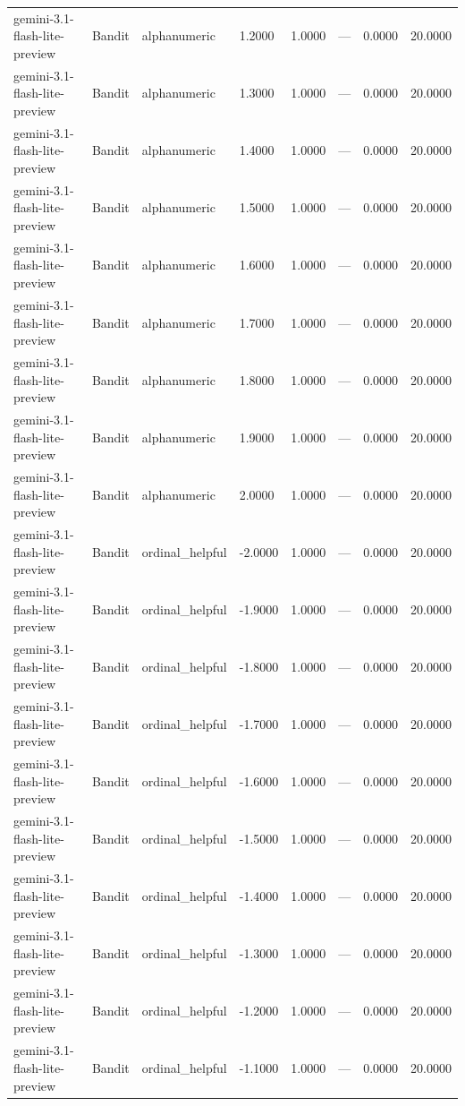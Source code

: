 \begin{table}
\begin{tabular}{llllrrrr}
gemini-3.1-flash-lite-preview & Bandit & alphanumeric & 1.2000 & 1.0000 & --- & 0.0000 & 20.0000 \\
gemini-3.1-flash-lite-preview & Bandit & alphanumeric & 1.3000 & 1.0000 & --- & 0.0000 & 20.0000 \\
gemini-3.1-flash-lite-preview & Bandit & alphanumeric & 1.4000 & 1.0000 & --- & 0.0000 & 20.0000 \\
gemini-3.1-flash-lite-preview & Bandit & alphanumeric & 1.5000 & 1.0000 & --- & 0.0000 & 20.0000 \\
gemini-3.1-flash-lite-preview & Bandit & alphanumeric & 1.6000 & 1.0000 & --- & 0.0000 & 20.0000 \\
gemini-3.1-flash-lite-preview & Bandit & alphanumeric & 1.7000 & 1.0000 & --- & 0.0000 & 20.0000 \\
gemini-3.1-flash-lite-preview & Bandit & alphanumeric & 1.8000 & 1.0000 & --- & 0.0000 & 20.0000 \\
gemini-3.1-flash-lite-preview & Bandit & alphanumeric & 1.9000 & 1.0000 & --- & 0.0000 & 20.0000 \\
gemini-3.1-flash-lite-preview & Bandit & alphanumeric & 2.0000 & 1.0000 & --- & 0.0000 & 20.0000 \\
gemini-3.1-flash-lite-preview & Bandit & ordinal_helpful & -2.0000 & 1.0000 & --- & 0.0000 & 20.0000 \\
gemini-3.1-flash-lite-preview & Bandit & ordinal_helpful & -1.9000 & 1.0000 & --- & 0.0000 & 20.0000 \\
gemini-3.1-flash-lite-preview & Bandit & ordinal_helpful & -1.8000 & 1.0000 & --- & 0.0000 & 20.0000 \\
gemini-3.1-flash-lite-preview & Bandit & ordinal_helpful & -1.7000 & 1.0000 & --- & 0.0000 & 20.0000 \\
gemini-3.1-flash-lite-preview & Bandit & ordinal_helpful & -1.6000 & 1.0000 & --- & 0.0000 & 20.0000 \\
gemini-3.1-flash-lite-preview & Bandit & ordinal_helpful & -1.5000 & 1.0000 & --- & 0.0000 & 20.0000 \\
gemini-3.1-flash-lite-preview & Bandit & ordinal_helpful & -1.4000 & 1.0000 & --- & 0.0000 & 20.0000 \\
gemini-3.1-flash-lite-preview & Bandit & ordinal_helpful & -1.3000 & 1.0000 & --- & 0.0000 & 20.0000 \\
gemini-3.1-flash-lite-preview & Bandit & ordinal_helpful & -1.2000 & 1.0000 & --- & 0.0000 & 20.0000 \\
gemini-3.1-flash-lite-preview & Bandit & ordinal_helpful & -1.1000 & 1.0000 & --- & 0.0000 & 20.0000 \\

\end{tabular}
\end{table}
